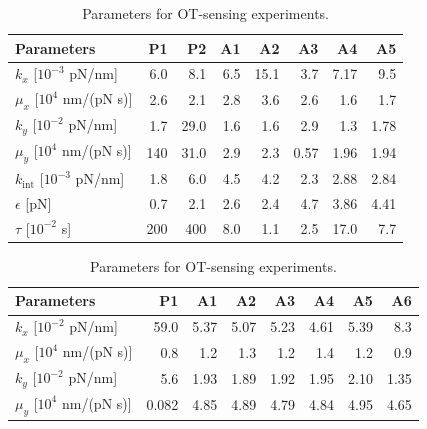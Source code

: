 \documentclass[
 longbibliography,
 twocolumn,
 superscriptaddress,
 amsmath,
 amssymb,
 amsthm,
 amsfonts,
 prl,
 floatfix,
]{revtex4-2}
\begin{document}
\begin{widetext}
\begin{table}[h]
    \centering
    \small
    \begin{minipage}{0.47\textwidth}
        \centering
        \begin{tabular}{l rrrrrrr}
            \toprule
            \textbf{Parameters} & \textbf{P1} & \textbf{P2} & \textbf{A1} & \textbf{A2} & \textbf{A3} & \textbf{A4} & \textbf{A5} \\
            \midrule
            $k_x$ [$10^{-3}$ pN/nm] & 6.0 & 8.1 & 6.5 & 15.1 & 3.7 & 7.17 & 9.5 \\
            $\mu_x$ [$10^4$ nm/(pN s)] & 2.6 & 2.1 & 2.8 & 3.6 & 2.6 & 1.6 & 1.7 \\
            $k_y$ [$10^{-2}$ pN/nm] & 1.7 & 29.0 & 1.6 & 1.6 & 2.9 & 1.3 & 1.78 \\
            $\mu_y$ [$10^4$ nm/(pN s)] & 140 & 31.0 & 2.9 & 2.3 & 0.57 & 1.96 & 1.94 \\
            $k_{\text{int}}$ [$10^{-3}$ pN/nm] & 1.8 & 6.0 & 4.5 & 4.2 & 2.3 & 2.88 & 2.84 \\
            $\epsilon$ [pN] & 0.7 & 2.1 & 2.6 & 2.4 & 4.7 & 3.86 & 4.41 \\
            $\tau$ [$10^{-2}$ s] & 200 & 400 & 8.0 & 1.1 & 2.5 & 17.0 & 7.7 \\
            \bottomrule
        \end{tabular}
        \caption{Parameters for OT-sensing experiments.}
        \label{stab:RBC_parameter_OT_ss}
    \end{minipage}
    \hspace{0.002\textwidth} %
    \begin{minipage}{0.48\textwidth}
        \centering
        \begin{tabular}{l rrrrrrr}
            \toprule
            \textbf{Parameters} & \textbf{P1} & \textbf{A1} & \textbf{A2} & \textbf{A3} & \textbf{A4} & \textbf{A5} & \textbf{A6} \\
            \midrule
            $k_x$ [$10^{-2}$ pN/nm] & 59.0 & 5.37 & 5.07 & 5.23 & 4.61 & 5.39 & 8.3 \\
            $\mu_x$ [$10^4$ nm/(pN s)] & 0.8 & 1.2 & 1.3 & 1.2 & 1.4 & 1.2 & 0.9 \\
            $k_y$ [$10^{-2}$ pN/nm] & 5.6 & 1.93 & 1.89 & 1.92 & 1.95 & 2.10 & 1.35 \\
            $\mu_y$ [$10^4$ nm/(pN s)] & 0.082 & 4.85 & 4.89 & 4.79 & 4.84 & 4.95 & 4.65 \\

\end{tabular}
\end{minipage}
\end{table}
\end{widetext}
\end{document}
